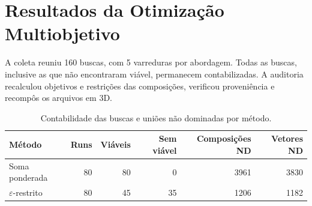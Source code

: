 \section{Resultados da Otimização Multiobjetivo}
\label{sec:resultados_tp2}
A coleta reuniu 160 buscas, com 5 varreduras por abordagem. Todas as buscas, inclusive as que não encontraram viável, permanecem contabilizadas. A auditoria recalculou objetivos e restrições das composições, verificou proveniência e recompôs os arquivos em 3D.
\begin{table}[H]\centering\small
\caption{Contabilidade das buscas e uniões não dominadas por método.}
\label{tab:tp2_metodos}
\begin{tabular}{lrrrrr}\toprule
Método & Runs & Viáveis & Sem viável & Composições ND & Vetores ND \\ \midrule
Soma ponderada & 80 & 80 & 0 & 3961 & 3830 \\
$\varepsilon$-restrito & 80 & 45 & 35 & 1206 & 1182 \\
\bottomrule\end{tabular}\end{table}

\begin{table}[H]\centering\small
\caption{Intervalos dos três objetivos nas uniões ND. Extremos de objetivos diferentes podem pertencer a composições diferentes.}
\label{tab:tp2_intervalos}
\end{table}
